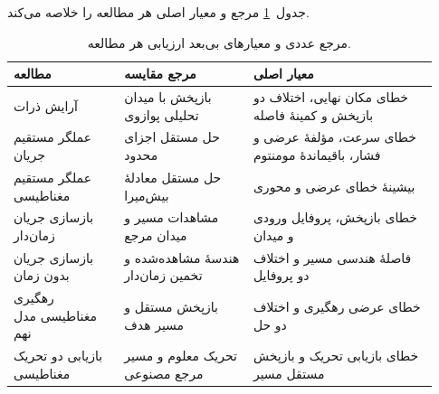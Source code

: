 جدول~\ref{tab:validation-summary} مرجع و معیار اصلی هر مطالعه را خلاصه می‌کند.

\begin{table}[htbp]
\centering
\small
\caption{مرجع عددی و معیارهای بی‌بعد ارزیابی هر مطالعه.}
\label{tab:validation-summary}
\begin{tabular}{@{}p{0.24\linewidth}p{0.29\linewidth}p{0.40\linewidth}@{}}
\hline
\textbf{مطالعه} & \textbf{مرجع مقایسه} & \textbf{معیار اصلی}\\
\hline
آرایش ذرات &
بازپخش با میدان تحلیلی پوازوی &
خطای مکان نهایی، اختلاف دو بازپخش و کمینهٔ فاصله\\
عملگر مستقیم جریان &
حل مستقل اجزای محدود &
خطای سرعت، مؤلفهٔ عرضی و فشار، باقیماندهٔ مومنتوم\\
عملگر مستقیم مغناطیسی &
حل مستقل معادلهٔ بیش‌میرا &
بیشینهٔ خطای عرضی و محوری\\
بازسازی جریان زمان‌دار &
مشاهدات مسیر و میدان مرجع &
خطای بازپخش، پروفایل ورودی و میدان\\
بازسازی جریان بدون زمان &
هندسهٔ مشاهده‌شده و تخمین زمان‌دار &
فاصلهٔ هندسی مسیر و اختلاف دو پروفایل\\
رهگیری مغناطیسی مدل نهم &
بازپخش مستقل و مسیر هدف &
خطای عرضی رهگیری و اختلاف دو حل\\
بازیابی دو تحریک مغناطیسی &
تحریک معلوم و مسیر مرجع مصنوعی &
خطای بازیابی تحریک و بازپخش مستقل مسیر\\
\hline
\end{tabular}
\end{table}
